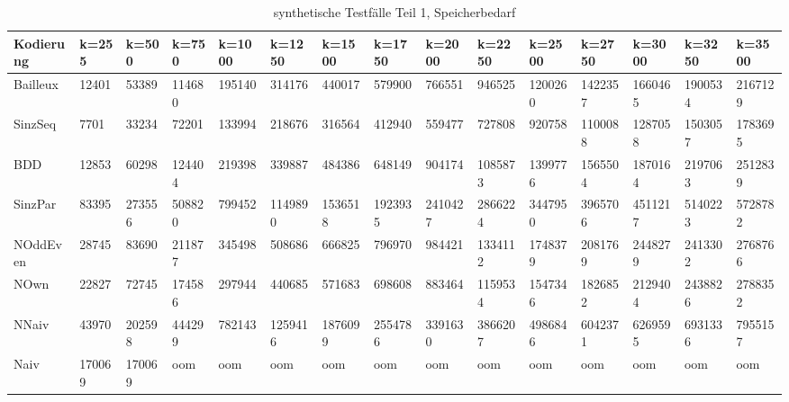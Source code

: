 \documentclass[a4,abstract=on]{scrartcl}
\begin{document}
\begin{landscape}
\begin{table}[h!]
    \small
    \setlength{\tabcolsep}{0.11cm}
     \centering
     \begin{tabular}[width=\textwidth]{|l||l|l|l|l|l|l|l|l|l|l|l|l|l|l|}
	\hline
       \textbf{Kodierung}  & \textbf{k=255} & \textbf{k=500} & \textbf{k=750} &\textbf{k=1000} &\textbf{k=1250} &\textbf{k=1500} &\textbf{k=1750} &\textbf{k=2000} &\textbf{k=2250} &\textbf{k=2500} &\textbf{k=2750} &\textbf{k=3000} &\textbf{k=3250} &\textbf{k=3500}\\ 
	\hline
	\hline
	Bailleux & 12401 & 53389 & 114680 & 195140 & 314176 & 440017 & 579900 & 766551 & 946525 & 1200260 & 1422357 & 1660465 & 1900534 & 2167129 \\
\hline
	SinzSeq &7701 & 33234 & 72201 & 133994 & 218676 & 316564 & 412940 & 559477 & 727808 & 920758 & 1100088 & 1287058 & 1503057 & 1783695 \\
\hline
	BDD & 12853 & 60298 & 124404 & 219398 & 339887 & 484386 & 648149 & 904174 & 1085873 & 1399776 & 1565504 & 1870164 & 2197063 & 2512839 \\
\hline
	SinzPar & 83395 & 273556 & 508820 & 799452 & 1149890 & 1536518 & 1923935 & 2410427 & 2866224 & 3447950 & 3965706 & 4511217 & 5140223 & 5728782  \\
\hline
	NOddEven & 28745 & 83690 & 211877 & 345498 & 508686 & 666825 & 796970 & 984421 & 1334112 & 1748379 & 2081769 & 2448279  & 2413302 & 2768766  \\
\hline
	NOwn & 22827 & 72745 & 174586 & 297944 & 440685 & 571683 & 698608 & 883464 & 1159534 & 1547346 & 1826852 & 2129404 & 2438826 & 2788352 \\
 \hline
	NNaiv & 43970 & 202598 & 444299 & 782143 & 1259416 & 1876099 & 2554786 & 3391630 & 3866207 & 4986846 & 6042371 & 6269595 & 6931336 & 7955157 \\
\hline
	Naiv & 170069 & 170069 &  oom &  oom &  oom &  oom &  oom &  oom &  oom &  oom &  oom &  oom &  oom &  oom\\
\hline
       
     \end{tabular}

     \caption{synthetische Testfälle Teil 1, Speicherbedarf}
     \label{tbl:beispieltabelle}

   \end{table}
	



\end{landscape}
\end{document}
